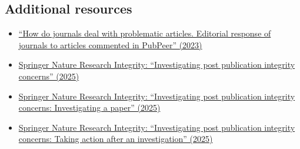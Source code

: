 \documentclass[letterpaper, 12pt]{article}
\begin{document}
\subsection*{Additional resources}

\begin{itemize}
    \setlength\itemsep{-0.5em}
    \item \href{https://doi.org/10.3145/epi.2023.ene.18}{``How do journals deal with problematic articles. Editorial response of journals to articles commented in PubPeer'' (2023)}
    \item \href{https://www.youtube.com/watch?v=NMc2yY-wLWw}{Springer Nature Research Integrity: ``Investigating post publication integrity concerns'' (2025)}
    \item \href{https://www.youtube.com/watch?v=WRD6RpIMgyI}{Springer Nature Research Integrity: ``Investigating post publication integrity concerns: Investigating a paper'' (2025)}
    \item \href{https://www.youtube.com/watch?v=wUqoOBXz_jw}{Springer Nature Research Integrity: ``Investigating post publication integrity concerns: Taking action after an investigation'' (2025)}
\end{itemize}
\end{document}
